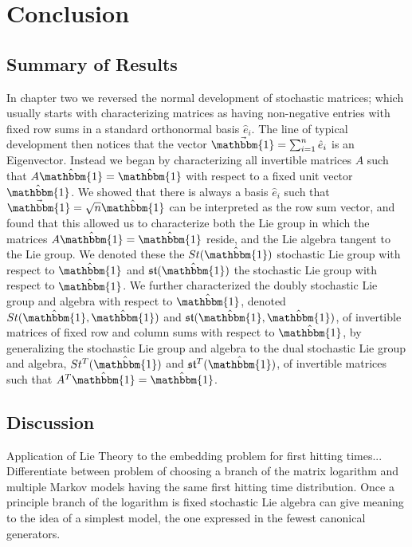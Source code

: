 \chapter{Conclusion}

\section{Summary of Results}
In chapter two we reversed the normal development of stochastic matrices; which
usually starts with characterizing matrices as having non-negative entries with
fixed row sums in a standard orthonormal basis $\hat{e}_i$. The line of typical
development then notices that the vector $\vec{\mathbbm{1}} = \sum_{i=1}^n \hat{e}_i$
is an Eigenvector. Instead we began by characterizing all invertible matrices $A$ 
such that $A \hat{\mathbbm{1}} = \hat{\mathbbm{1}}$ with respect to a fixed unit 
vector $\hat{\mathbbm{1}}$. We showed that there is always a basis $\hat{e}_i$ 
such that $\vec{\mathbbm{1}} = \sqrt{n} \hat{\mathbbm{1}}$ can be interpreted as 
the row sum vector, and found that this allowed us to characterize both the Lie 
group in which the matrices $A \hat{\mathbbm{1}} = \hat{\mathbbm{1}}$ reside, 
and the Lie algebra tangent to the Lie group. We denoted these the $St(\hat{\mathbbm{1}})$ 
stochastic Lie group with respect to $\hat{\mathbbm{1}}$ and $\mathfrak{st}(\hat{\mathbbm{1}})$ 
the stochastic Lie group with respect to $\hat{\mathbbm{1}}$. We further 
characterized the doubly stochastic Lie group and algebra with respect to $\hat{\mathbbm{1}}$, 
denoted $St(\hat{\mathbbm{1}}, \hat{\mathbbm{1}})$ and $\mathfrak{st}(\hat{\mathbbm{1}}, \hat{\mathbbm{1}})$,
of invertible matrices of fixed row and column sums with respect to $\hat{\mathbbm{1}}$,
by generalizing the stochastic Lie group and algebra to the dual stochastic Lie
group and algebra, $St^T(\hat{\mathbbm{1}})$ and $\mathfrak{st}^T(\hat{\mathbbm{1}})$, 
of invertible matrices such that $A^T \hat{\mathbbm{1}} = \hat{\mathbbm{1}}$.

\section{Discussion}
Application of Lie Theory to the embedding problem for first hitting times...
Differentiate between problem of choosing a branch of the matrix logarithm
and multiple Markov models having the same first hitting time distribution.
Once a principle branch of the logarithm is fixed stochastic Lie algebra can 
give meaning to the idea of a simplest model, the one expressed in the fewest 
canonical generators.